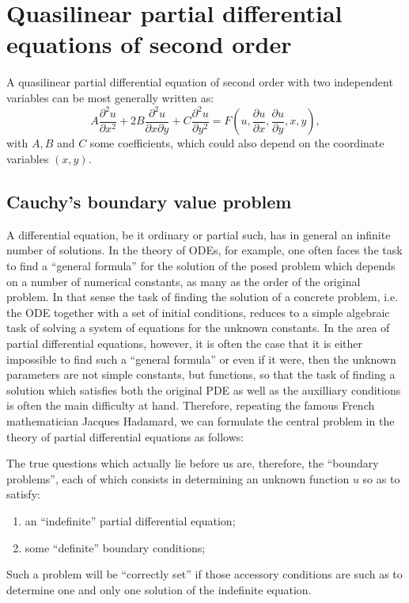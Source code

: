 \section{Quasilinear partial differential equations of second order}

A quasilinear partial differential equation of second order with two independent variables can be most generally written as:
\begin{equation}
  \label{eq:pdesecondorder}
  A\frac{\partial^2 u}{\partial x^2}+2B\frac{\partial ^2u}{\partial x \partial y}+C\frac{\partial^2 u}{\partial y^2} = F(u,\frac{\partial u}{\partial x},\frac{\partial u}{\partial y},x,y), 
\end{equation}
with $A,B $ and $C$ some coefficients, which could also depend on the coordinate variables $(x,y)$.
\subsection{Cauchy's boundary value problem}

A differential equation, be it ordinary or partial such, has in general an infinite number of solutions. In the theory of ODEs, for example, 
one often faces the task to find a ``general formula'' for the solution of the posed problem which depends on a number of numerical constants, as many 
as the order of the original problem. In that sense the task of finding the solution of a concrete problem, i.e. the ODE together with a set of initial conditions, reduces to a 
simple algebraic task of solving a system of equations for the unknown constants. In the area of partial differential equations, however, it is often the case that it is either impossible 
to find such a ``general formula'' or even if it were, then the unknown parameters are not simple constants, but functions, so that the task of finding a solution which satisfies both the original PDE as 
well as the auxilliary conditions is often the main difficulty at hand. Therefore, repeating the famous French mathematician Jacques Hadamard, we can formulate the central problem in the theory of partial differential 
equations as follows:
\begin{displayquote}
The true questions which actually lie before us are, therefore, the ``boundary problems'', each of which consists in determining an unknown function $u$ so as to satisfy:
\begin{enumerate}
  \item an ``indefinite'' partial differential equation; 
  \item some ``definite'' boundary conditions; 
\end{enumerate}
Such a problem will be ``correctly set'' if those accessory conditions are such as to determine one and only one solution of the indefinite equation.
\end{displayquote}

